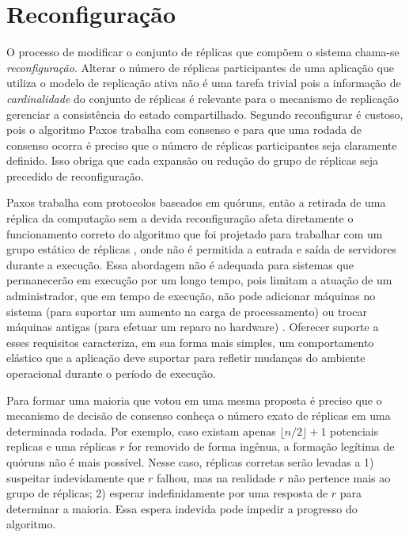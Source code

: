 \section{Reconfiguração}\label{sec:reconfiguracao}

O processo de modificar o conjunto de réplicas que compõem o sistema chama-se
\emph{reconfiguração}. Alterar o número de réplicas participantes de uma aplicação que
utiliza o modelo de replicação ativa não é uma tarefa trivial pois a informação de
\emph{cardinalidade} do conjunto de réplicas é relevante para o mecanismo de replicação
gerenciar a consistência do estado compartilhado. Segundo 
reconfigurar é custoso, pois o algoritmo  Paxos trabalha com consenso e para que uma
rodada de consenso ocorra é preciso que o número de réplicas participantes seja claramente
definido. Isso obriga que cada expansão ou redução do grupo de réplicas seja precedido de
reconfiguração.

Paxos trabalha com protocolos baseados em quóruns, então a retirada de uma réplica da
computação sem a devida reconfiguração afeta diretamente o funcionamento correto do
algoritmo que foi projetado para trabalhar com um grupo estático de réplicas
\cite{chandra96, lamport98}, onde não é permitida a entrada e saída de servidores durante
a execução. Essa abordagem não é adequada para sistemas que permanecerão em execução por
um longo tempo, pois limitam a atuação de um administrador, que em tempo de execução, não
pode adicionar máquinas no sistema (para suportar um aumento na carga de processamento) ou
trocar máquinas antigas (para efetuar um reparo no hardware) \cite{alchieri14}. Oferecer
suporte a esses requisitos caracteriza, em sua forma mais simples, um comportamento
elástico que a aplicação deve suportar para refletir mudanças do ambiente operacional
durante o período de execução.

Para formar uma maioria que votou em uma mesma proposta é preciso que o mecanismo de
decisão de consenso conheça o número exato de réplicas em uma determinada rodada. Por
exemplo, caso existam apenas $\lfloor n/2 \rfloor + 1$ potenciais replicas e uma réplicas
$r$ for removido de forma ingênua, a formação legítima de quóruns não é mais possível.
Nesse caso, réplicas corretas serão levadas a 1) suspeitar indevidamente que $r$ falhou,
mas na realidade $r$ não pertence mais ao grupo de réplicas; 2) esperar indefinidamente
por uma resposta de $r$ para determinar a maioria. Essa espera indevida pode impedir a
progresso do algoritmo.

